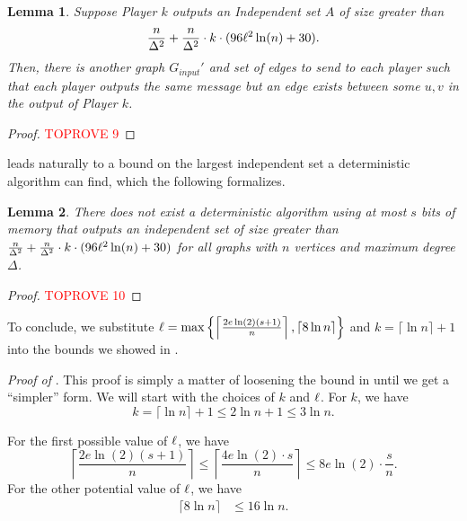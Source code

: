 \documentclass[11pt]{article}
\newtheorem{lemma}{Lemma}[section]
\theoremstyle{definition}
\renewcommand{\leq}{\leqslant}
\renewcommand{\le}{\leq}
\begin{document}
\begin{lemma}\label{find-breaking-element}
Suppose Player $k$ outputs an Independent set $A$ of size greater than 
\begin{align*}
    \frac{n}{\Delta^2}+\frac{n}{\Delta^2}\cdot k\cdot (96{\ell}^2\ln(n)+30).
\end{align*}
Then, there is another graph $G_{input}'$ and set of edges to send to each player such that each player outputs the same message but an edge exists between some $u, v$ in the output of Player $k$. 
\end{lemma}
\begin{proof}\textcolor{red}{TOPROVE 9}\end{proof}

 leads naturally to a bound on the largest independent set a deterministic algorithm can find, which the following formalizes. 

\begin{lemma}\label{deterministic-lower-bound}
There does not exist a deterministic algorithm using at most $s$ bits of memory that outputs an independent set of size greater than $\frac{n}{\Delta^2}+\frac{n}{\Delta^2}\cdot k\cdot (96{\ell}^2\ln(n)+30)$ for all graphs with $n$ vertices and maximum degree $\Delta$.
\end{lemma}
\begin{proof}\textcolor{red}{TOPROVE 10}\end{proof}

To conclude, we substitute ${\ell}=\max\left\{\left\lceil\frac{2e\ln(2)(s+1)}n \right\rceil, \left\lceil8\ln n\right\rceil\right\}$ and $k=\lceil \ln n\rceil +1$ into the bounds we showed in .

\noindent
\textit{Proof of }. This proof is simply a matter of loosening the bound in  until we get a ``simpler'' form. We will start with the choices of $k$ and ${\ell}$. For $k$, we have
    \[
        k=\lceil\ln n\rceil+1 \le 2\ln n+1\le 3\ln n.
    \]

For the first possible value of $\ell$, we have
\[ 
    \left\lceil\frac{2e\ln(2)(s+1)}n \right\rceil\le \left\lceil\frac{4e\ln(2)\cdot s}n \right\rceil\le 8e\ln(2)\cdot \frac sn.
\]
For the other potential value of $\ell$, we have
\begin{align*}
    \lceil 8\ln n\rceil&\le 16\ln n.
\end{align*}
\end{document}
